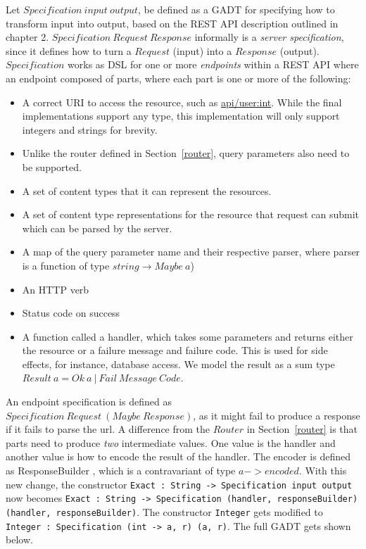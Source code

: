 Let $Specification\ input\ output$, be defined as a GADT for specifying how to
transform input into output, based on the REST API description outlined in
chapter 2.  $Specification\ Request\ Response$ informally is a \textit{server
specification}, since it defines how to turn a $Request$ (input) into a
$Response$ (output). $Specification$ works as DSL for one or more
\textit{endpoints} within a REST API where an endpoint composed of parts, where
each part is one or more of the following:

\begin{itemize}
    \item A correct URI to access the resource, such as \url{api/user:int}.
        While the final implementations support any type, this implementation
        will only support integers and strings for brevity.
    \item Unlike the router defined in Section~\ref{router}, query parameters
        also need to be supported.
    \item A set of content types that it can represent the resources.
    \item A set of content type representations for the resource that request can
        submit which can be parsed by the server.
    \item A map of the query parameter name and their respective parser,
        where parser is a function of type $string \rightarrow Maybe\ a$)
    \item An HTTP verb
    \item Status code on success
    \item A function called a handler, which takes some parameters and returns
        either the resource or a failure message and failure code. This is used
        for side effects, for instance, database access. We model the result as
        a sum type $Result\ a = Ok\ a\ |\ Fail\ Message\ Code$.
\end{itemize}

An endpoint specification is defined as $Specification\ Request\ (Maybe\
Response)$, as it might fail to produce a response if it fails to parse the url.
A difference from the $Router$ in Section~\ref{router} is that parts need to
produce \textit{two} intermediate values.  One value is the handler and another
value is how to encode the result of the handler. The encoder is defined as
ResponseBuilder , which is a contravariant of type $a -> encoded$.  With this
new change, the constructor \texttt{Exact : String -> Specification input
output} now becomes \texttt{Exact : String -> Specification (handler,
responseBuilder) (handler, responseBuilder)}. The constructor \texttt{Integer}
gets modified to \texttt{Integer : Specification (int -> a, r) (a, r)}. The full
GADT gets shown below.

